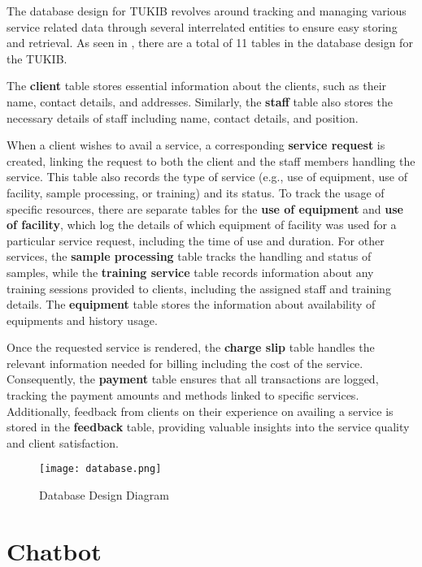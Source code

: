 The database design for TUKIB revolves around tracking and managing various service related data through several interrelated entities to ensure easy storing and retrieval. As seen in , there are a total of 11 tables in the database design for the TUKIB. 

The \textbf{client} table stores essential information about the clients, such as their name, contact details, and addresses. Similarly, the \textbf{staff} table also stores the necessary details of staff including name, contact details, and position. 

When a client wishes to avail a service, a corresponding \textbf{service request} is created, linking the request to both the client and the staff members handling the service. This table also records the type of service (e.g., use of equipment, use of facility, sample processing, or training) and its status. To track the usage of specific resources, there are separate tables for the \textbf{use of equipment} and \textbf{use of facility}, which log the details of which equipment of facility was used for a particular service request, including the time of use and duration. For other services, the \textbf{sample processing} table tracks the handling and status of samples, while the \textbf{training service} table records information about any training sessions provided to clients, including the assigned staff and training details. The \textbf{equipment} table stores the information about availability of equipments and history usage. 

Once the requested service is rendered, the \textbf{charge slip} table handles the relevant information needed for billing including the cost of the service. Consequently, the \textbf{payment} table ensures that all transactions are logged, tracking the payment amounts and methods linked to specific services. Additionally, feedback from clients on their experience on availing a service is stored in the \textbf{feedback} table, providing valuable insights into the service quality and client satisfaction.

\begin{figure}[h]
	\centering 
	\texttt{[image: database.png]}
	\caption{Database Design Diagram}
	\label{fig:database}
\end{figure}

\newpage

\section{Chatbot}

